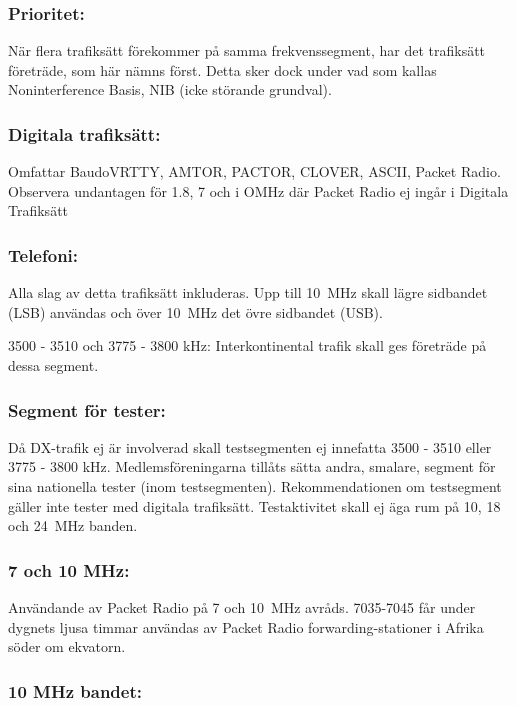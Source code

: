 \subsubsection{Prioritet:}

När flera trafiksätt förekommer på samma frekvenssegment, har det
trafiksätt företräde, som här nämns först. Detta sker dock under
vad som kallas Noninterference Basis, NIB (icke störande grundval).

\subsubsection{Digitala trafiksätt:}

Omfattar BaudoVRTTY, AMTOR, PACTOR, CLOVER, ASCII, Packet Radio.
Observera undantagen för 1.8, 7 och i OMHz där Packet Radio ej
ingår i Digitala Trafiksätt

\subsubsection{Telefoni:}

Alla slag av detta trafiksätt inkluderas. Upp till 10~MHz
skall lägre sidbandet (LSB) användas och över 10~MHz
det övre sidbandet (USB).

3500 - 3510 och 3775 - 3800 kHz:
Interkontinental trafik skall ges företräde på dessa segment.

\subsubsection{Segment för tester:}

Då DX-trafik ej är involverad skall testsegmenten ej innefatta
3500 - 3510 eller 3775 - 3800 kHz. Medlemsföreningarna tillåts
sätta andra, smalare, segment för sina nationella tester
(inom testsegmenten). Rekommendationen om testsegment gäller
inte tester med digitala trafiksätt.
Testaktivitet skall ej äga rum på 10, 18 och 24~MHz banden.

\subsubsection{7 och 10 MHz:}

Användande av Packet Radio på 7 och 10~MHz avråds.
7035-7045 får under dygnets ljusa timmar användas av
Packet Radio forwarding-stationer i Afrika söder om
ekvatorn.

\subsubsection{10 MHz bandet:}

